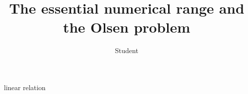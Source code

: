 \documentclass[xcolor=dvipsnames]{beamer}
\title[The essential numerical range and the Olsen problem]{The 
essential numerical range and the Olsen problem}
\author[{Student} (University of ....)]{Student}
\begin{document}
\begin{frame}{linear relation}

\end{frame}
\end{document}
